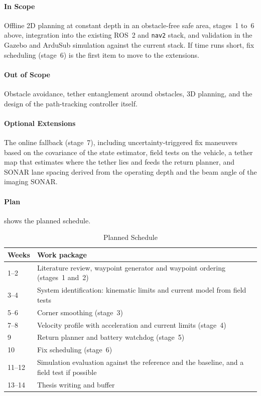 \documentclass[article,notoc]{IDSCreport}
\begin{document}
\paragraph{In Scope} Offline 2D planning at constant depth in an obstacle-free
safe area, stages~1 to~6 above, integration into the existing ROS~2 and
\texttt{nav2} stack, and validation in the Gazebo and ArduSub simulation against
the current stack. If time runs short, fix scheduling (stage~6) is the first
item to move to the extensions.

\paragraph{Out of Scope} Obstacle avoidance, tether entanglement around
obstacles, 3D planning, and the design of the path-tracking controller
itself.

\paragraph{Optional Extensions} The online fallback (stage~7), including
uncertainty-triggered fix maneuvers based on the covariance of the state
estimator, field tests on the vehicle, a tether map that estimates where the
tether lies and feeds the return planner, and SONAR lane spacing derived from
the operating depth and the beam angle of the imaging SONAR.

\paragraph{Plan}  shows the planned schedule.

\begin{table}[htbp]
    \centering
    \caption{Planned Schedule}
    \label{tab:Plan}
    \begin{tabular}{lp{}}
        \toprule
        Weeks  & Work package \\
        \midrule
        1--2   & Literature review, waypoint generator and waypoint ordering (stages~1 and~2) \\
        3--4   & System identification: kinematic limits and current model from field tests \\
        5--6   & Corner smoothing (stage~3) \\
        7--8   & Velocity profile with acceleration and current limits (stage~4) \\
        9      & Return planner and battery watchdog (stage~5) \\
        10     & Fix scheduling (stage~6) \\
        11--12 & Simulation evaluation against the reference and the baseline, and a field test if possible \\
        13--14 & Thesis writing and buffer \\
        \bottomrule
    \end{tabular}
\end{table}
\end{document}

